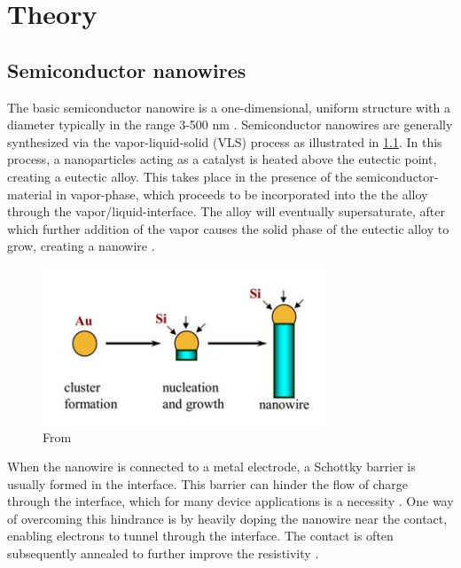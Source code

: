 \chapter{Theory}

\section{Semiconductor nanowires}
The basic semiconductor nanowire is a one-dimensional, uniform structure with a diameter typically in the range 3-500 nm \cite{http://cml.harvard.edu/assets/MRSBull36-1052_Lieber.pdf}. Semiconductor nanowires are generally synthesized via the vapor-liquid-solid (VLS) process as illustrated in \cref{fig:nanowire-growth}. In this process, a nanoparticles acting as a catalyst is heated above the eutectic point, creating a eutectic alloy. This takes place in the presence of the semiconductor-material in vapor-phase, which proceeds to be incorporated into the the alloy through the vapor/liquid-interface. The alloy will eventually supersaturate, after which further addition of the vapor causes the solid phase of the eutectic alloy to grow, creating a nanowire \cite{Lieber, WeiLu}. 

\begin{figure}
	\centering
	\includegraphics[width=0.7\linewidth]{fig/nanowire-growth}
	\caption{From \cite{WeiLu}}
	\label{fig:nanowire-growth}
\end{figure}

When the nanowire is connected to a metal electrode, a Schottky barrier is usually formed in the interface. This barrier can hinder the flow of charge through the interface, which for many device applications is a necessity \cite{nanowire-paper}. One way of overcoming this hindrance is by heavily doping the nanowire near the contact, enabling electrons to tunnel through the interface. The contact is often subsequently annealed to further improve the resistivity \cite{Lieber}.

